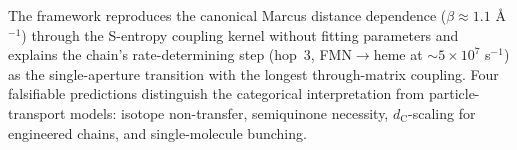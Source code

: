 \documentclass[11pt,twocolumn,a4paper]{article}
\theoremstyle{definition}
\theoremstyle{remark}
\newcommand{\dC}{d_{\mathrm{C}}}
\begin{document}
The framework reproduces the canonical Marcus distance dependence
($\beta \approx 1.1$ \AA$^{-1}$) through the S-entropy coupling kernel
without fitting parameters and explains the chain's rate-determining
step (hop~3, FMN$\to$heme at $\sim 5 \times 10^7$ s$^{-1}$) as the
single-aperture transition with the longest through-matrix coupling.
Four falsifiable predictions distinguish the categorical interpretation
from particle-transport models: isotope non-transfer, semiquinone
necessity, $\dC$-scaling for engineered chains, and single-molecule
bunching.



\end{document}
